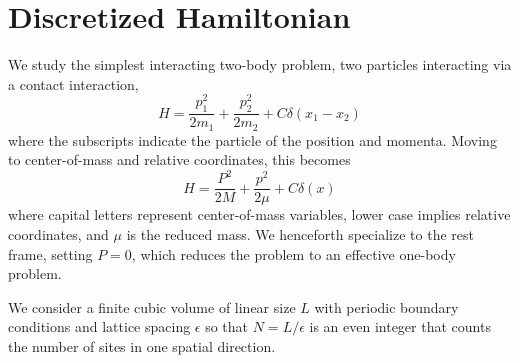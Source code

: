 \section{Discretized Hamiltonian}\label{sec:hamiltonian}

We study the simplest interacting two-body problem, two particles interacting via a contact interaction,
\begin{equation}
    \label{eq:particle hamiltonian}
    H = \frac{p_1^2}{2 m_1} + \frac{p_2^2}{2 m_2} + C \delta(x_1-x_2)
\end{equation}
where the subscripts indicate the particle of the position and momenta.  Moving to center-of-mass and relative coordinates, this becomes
\begin{equation}
    \label{eq:hamiltonian}
    H = \frac{P^2}{2 M} + \frac{p^2}{2 \mu} + C \delta(x)
\end{equation}
where capital letters represent center-of-mass variables, lower case implies relative coordinates, and $\mu$ is the reduced mass.  We henceforth specialize to the rest frame, setting $P=0$, which reduces the problem to an effective one-body problem.

We consider a finite cubic volume of linear size $L$ with periodic boundary conditions and lattice spacing $\epsilon$ so that $N=L/\epsilon$ is an even integer that counts the number of sites in one spatial direction.

